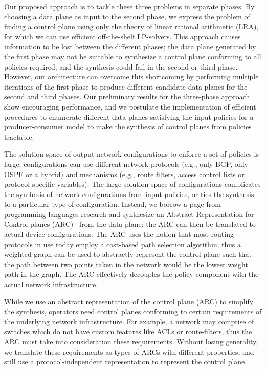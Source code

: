 Our proposed approach is to tackle these three problems in separate phases.
By choosing a data plane as input to the second phase, we 
express the problem of finding a control plane using only the 
theory of linear rational arithmetic (LRA), for which we can use
efficient off-the-shelf LP-solvers. 
This approach causes information to be lost between the different phases;
the data plane generated by the first phase may not be suitable to 
synthesize a control plane conforming to all policies required, and 
the synthesis could fail in the second or third phase. 
However, our architecture can overcome this shortcoming 
by performing
multiple iterations of the first phase to produce different 
candidate data planes for the second and third phases.
Our preliminary results for the three-phase
approach show encouraging performance, and we 
postulate the implementation of 
efficient procedures to enumerate different data 
planes satisfying the input policies for a 
producer-consumer model to make the synthesis of 
control planes from policies tractable.  

The solution space of output network configurations to 
enforce a set of policies
is large; configurations can use different 
network protocols (e.g., only BGP, only OSPF or a hybrid) and
mechanisms (e.g., route filters, access control lists
or protocol-specific variables). The large solution space
of configurations complicates the synthesis of
network configurations from
input policies, 
or ties the synthesis to a particular type of configuration. 
Instead, we borrow a page from programming languages
research and
synthesize an Abstract Representation for Control planes (ARC)~\cite{arc} 
from the data plane; the ARC can then be translated to actual device configurations.
The ARC uses the notion that most routing protocols in use 
today employ a cost-based path selection algorithm; thus a weighted
graph can be used to abstractly represent the control plane such that 
the path between two points taken in the network would be 
the lowest weight path in the graph. 
The ARC effectively decouples the policy component with the 
actual network infrastructure. 

While we use an abstract representation of the control
plane (ARC) to simplify the synthesis, operators need control 
planes conforming to certain requirements of the 
underlying network infrastructure. For example, a 
network may comprise of switches which do not have custom
features like ACLs or route-filters, thus the ARC must take 
into consideration these requirements. Without losing 
generality, we translate these 
requirements as types of ARCs with different properties,
and still use a protocol-independent representation
to represent the control plane. 

